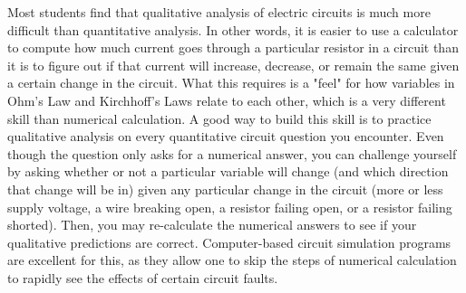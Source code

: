 Most students find that qualitative analysis of electric circuits is much more difficult than quantitative analysis.  In other words, it is easier to use a calculator to compute how much current goes through a particular resistor in a circuit than it is to figure out if that current will increase, decrease, or remain the same given a certain change in the circuit.  What this requires is a "feel" for how variables in Ohm's Law and Kirchhoff's Laws relate to each other, which is a very different skill than numerical calculation.  A good way to build this skill is to practice qualitative analysis on every quantitative circuit question you encounter.  Even though the question only asks for a numerical answer, you can challenge yourself by asking whether or not a particular variable will change (and which direction that change will be in) given any particular change in the circuit (more or less supply voltage, a wire breaking open, a resistor failing open, or a resistor failing shorted).  Then, you may re-calculate the numerical answers to see if your qualitative predictions are correct.  Computer-based circuit simulation programs are excellent for this, as they allow one to skip the steps of numerical calculation to rapidly see the effects of certain circuit faults.

